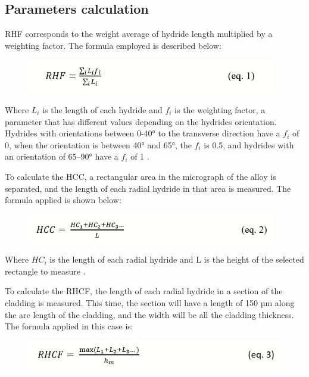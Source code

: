 \documentclass[12pt]{article}
\begin{document}
\subsection{Parameters calculation}


\noindent
RHF corresponds to the weight average of hydride length multiplied by a weighting factor. The formula employed is described below:

\begin{figure}[h] %
    \raggedleft
    \includegraphics[width=4.3in]{RHF.JPG}
    \label{fig:my_label}
\end{figure}


\noindent
Where $L_i$ is the length of each hydride and $f_i$ is the weighting factor, a parameter that has different values depending on the hydrides orientation. Hydrides with orientations between 0-40° to the transverse direction have a $f_i$ of 0, when the orientation is between 40° and 65°, the $f_i$ is 0.5, and hydrides with an orientation of 65–90° have a $f_i$ of 1 \cite{COLAS2013586}. 

\noindent
To calculate the HCC, a rectangular area in the micrograph of the alloy is separated, and the length of each radial hydride in that area is measured. The formula applied is shown below:


\begin{figure}[h] %
    \raggedleft
    \includegraphics[width=4.3in]{HCC.JPG}
    \label{fig:my_label}
\end{figure}
\noindent
Where $HC_i$ is the length of each radial hydride and L is the height of the selected rectangle to measure \cite{SIMON2021152817}.

\noindent
To calculate the RHCF, the length of each radial hydride in a section of the cladding is measured. This time, the section will have a length of 150 µm along the arc length of the cladding, and the width will be all the cladding thickness. The formula applied in this case is:

\begin{figure}[h] %
    \raggedleft
    \includegraphics[width=4.5in]{RHCF.JPG}
    \label{fig:my_label}
\end{figure}
\end{document}
